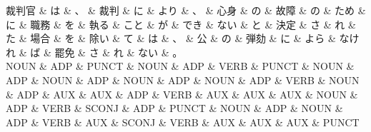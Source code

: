 \documentclass[tikz,border=5pt]{standalone}
\begin{document}
\small
\begin{dependency}[edge unit distance=6.6pt]
    \begin{deptext}[column sep=0.5em]
        裁判官 \& は \& 、 \& 裁判 \& に \& より \& 、 \& 心身 \& の \& 故障 \& の \& ため \& に \& 職務 \& を \& 執る \& こと \& が \& でき \& ない \& と \& 決定 \& さ \& れ \& た \& 場合 \& を \& 除い \& て \& は \& 、 \& 公 \& の \& 弾劾 \& に \& よら \& なけれ \& ば \& 罷免 \& さ \& れ \& ない \& 。\\
        NOUN \& ADP \& PUNCT \& NOUN \& ADP \& VERB \& PUNCT \& NOUN \& ADP \& NOUN \& ADP \& NOUN \& ADP \& NOUN \& ADP \& VERB \& NOUN \& ADP \& AUX \& AUX \& ADP \& VERB \& AUX \& AUX \& AUX \& NOUN \& ADP \& VERB \& SCONJ \& ADP \& PUNCT \& NOUN \& ADP \& NOUN \& ADP \& VERB \& AUX \& SCONJ \& VERB \& AUX \& AUX \& AUX \& PUNCT\\
    \end{deptext}
\end{dependency}
\end{document}
